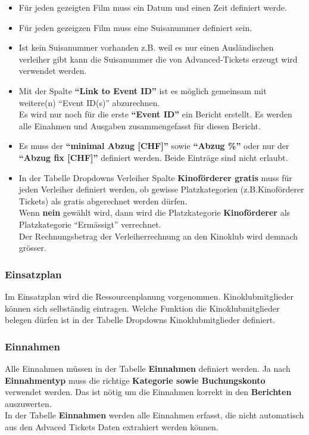 \documentclass[
]{article}
\providecommand{\tightlist}{%
  \setlength{\itemsep}{0pt}\setlength{\parskip}{0pt}}
\begin{document}
\begin{itemize}
\tightlist
\item
  Für jeden gezeigten Film muss ein Datum und einen Zeit definiert
  werde.
\item
  Für jeden gezeigzen Film muss eine Suisanummer definiert sein.
\item
  Ist kein Suisanummer vorhanden z.B. weil es nur einen Ausländischen
  verleiher gibt kann die Suisanummer die von Advanced-Tickets erzeugt
  wird verwendet werden.
\item
  Mit der Spalte \textbf{``Link to Event ID''} ist es möglich gemeinsam
  mit weitere(n) ``Event ID(s)'' abzurechnen.\\
  Es wird nur noch für die erste \textbf{``Event ID''} ein Bericht
  erstellt. Es werden alle Einahmen und Ausgaben zusammengefasst für
  diesen Bericht.
\item
  Es muss der \textbf{``minimal Abzug {[}CHF{]}''} sowie \textbf{``Abzug
  \%''} oder nur der \textbf{``Abzug fix {[}CHF{]}''} definiert werden.
  Beide Einträge sind nicht erlaubt.
\item
  In der Tabelle Dropdowns Verleiher Spalte \textbf{Kinoförderer gratis}
  muss für jeden Verleiher definiert werden, ob gewisse Platzkategorien
  (z.B.Kinoförderer Tickets) als gratis abgerechnet werden dürfen.\\
  Wenn \textbf{nein} gewählt wird, dann wird die Platzkategorie
  \textbf{Kinoförderer} als Platzkategorie ``Ermässigt'' verrechnet.\\
  Der Rechnungsbetrag der Verleiherrechnung an den Kinoklub wird demnach
  grösser.
\end{itemize}

\subsubsection{Einsatzplan}\label{einsatzplan}

Im Einsatzplan wird die Ressourcenplanung vorgenommen.
Kinoklubmitglieder können sich selbständig eintragen. Welche Funktion
die Kinoklubmitglieder belegen dürfen ist in der Tabelle Dropdowns
Kinoklubmitglieder definiert.

\subsubsection{Einnahmen}\label{einnahmen}

Alle Einnahmen müssen in der Tabelle \textbf{Einnahmen} definiert
werden. Ja nach \textbf{Einnahmentyp} muss die richtige
\textbf{Kategorie sowie Buchungskonto} verwendet werden. Das ist nötig
um die Einnahmen korrekt in den \textbf{Berichten} auszuwerten.\\
In der Tabelle \textbf{Einnahmen} werden alle Einnahmen erfasst, die
nicht automatisch aus den Advaced Tickets Daten extrahiert werden
können.
\end{document}
